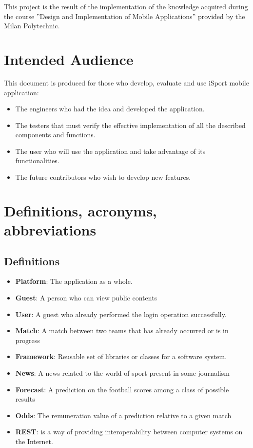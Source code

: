 \documentclass[numbers=noenddot, 12pt, a4paper, oneside]{scrbook}
\begin{document}
This project is the result of the  implementation of the knowledge acquired during the course ”Design and Implementation of Mobile Applications” provided by the Milan Polytechnic.

\section{Intended Audience}
This document is produced for those who develop, evaluate and use iSport mobile application:
\begin{itemize}
	\item The engineers who had the idea and developed the application.
	\item The testers that must verify the effective implementation of all the described components and functions.
	\item The user who will use the application and take advantage of its functionalities.
	\item The future contributors who wish to develop new features.
\end{itemize}

\section{Definitions, acronyms, abbreviations}
\subsection*{Definitions}
\begin{itemize}
	\item \textbf{Platform}: The application as a whole.
	\item \textbf{Guest}: A person who can view public contents
	\item \textbf{User}: A guest who already performed the login operation successfully.
	\item \textbf{Match}: A match between two teams that has already occurred or is in progress
	\item \textbf{Framework}: Reusable set of libraries or classes for a software system.
	\item \textbf{News}: A news related to the world of sport present in some journalism
	\item \textbf{Forecast}: A prediction on the football scores among a class of possible results
	\item \textbf{Odds}: The remuneration value of a prediction relative to a given match
	\item \textbf{REST}: is a way of providing interoperability between computer systems on the Internet.
\end{itemize}
\end{document}
